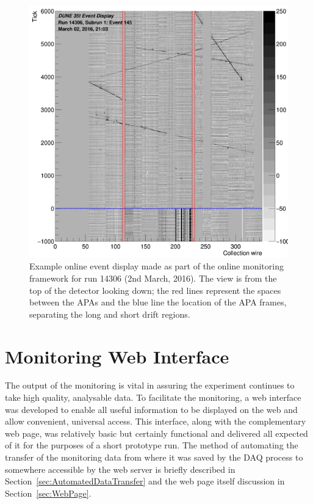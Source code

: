 \begin{figure}[p]
  \centering
  \includegraphics[width=14cm]{evd.png}
  \caption[Example online event display made by the Online Monitoring framework]{Example online event display made as part of the online monitoring framework for run 14306 (2nd March, 2016).  The view is from the top of the detector looking down; the red lines represent the spaces between the APAs and the blue line the location of the APA frames, separating the long and short drift regions.}
  \label{fig:EVD}
\end{figure}

\section{Monitoring Web Interface}\label{sec:WebInterface}

The output of the monitoring is vital in assuring the experiment continues to take high quality, analysable data.  To facilitate the monitoring, a web interface was developed to enable all useful information to be displayed on the web and allow convenient, universal access.  This interface, along with the complementary web page, was relatively basic but certainly functional and delivered all expected of it for the purposes of a short prototype run.  The method of automating the transfer of the monitoring data from where it was saved by the DAQ process to somewhere accessible by the web server is briefly described in Section~\ref{sec:AutomatedDataTransfer} and the web page itself discussion in Section~\ref{sec:WebPage}.

